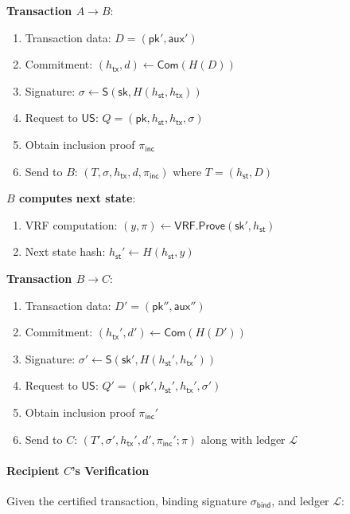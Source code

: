 \documentclass{article}
\newcommand{\sig}[0]{\mathsf{S}}
\newcommand{\pubkey}[0]{\mathsf{pk}}
\newcommand{\prikey}[0]{\mathsf{sk}}
\newcommand{\commit}[0]{\mathsf{Com}}
\newcommand{\unisrv}[0]{\mathsf{US}}
\newcommand{\sthash}[0]{{h_\mathsf{st}}}
\newcommand{\txhash}[0]{{h_\mathsf{tx}}}
\newcommand{\auxd}[0]{\mathsf{aux}}
\newcommand{\pinc}[0]{{\pi_{\mathsf{inc}}}}
\begin{document}
\medskip
\noindent\textbf{Transaction $A \to B$}:

\begin{enumerate}
\item Transaction data: $D = (\pubkey', \auxd')$
\item Commitment: $(\txhash, d) \gets \commit(H(D))$
\item Signature: $\sigma \gets \sig(\prikey, H(\sthash, \txhash))$
\item Request to $\unisrv$: $Q = (\pubkey, \sthash, \txhash, \sigma)$
\item Obtain inclusion proof $\pinc$
\item Send to $B$: $(T, \sigma, \txhash, d, \pinc)$ where $T = (\sthash, D)$
\end{enumerate}

\medskip
\noindent\textbf{$B$ computes next state}:

\begin{enumerate}
\item VRF computation: $(y, \pi) \gets \mathsf{VRF.Prove}(\prikey', \sthash)$
\item Next state hash: $\sthash' \gets H(\sthash, y)$
\end{enumerate}

\medskip
\noindent\textbf{Transaction $B \to C$}:

\begin{enumerate}
\item Transaction data: $D' = (\pubkey'', \auxd'')$
\item Commitment: $(\txhash', d') \gets \commit(H(D'))$
\item Signature: $\sigma' \gets \sig(\prikey', H(\sthash', \txhash'))$
\item Request to $\unisrv$: $Q' = (\pubkey', \sthash', \txhash', \sigma')$
\item Obtain inclusion proof $\pinc'$
\item Send to $C$: $(T', \sigma', \txhash', d', \pinc'; \pi)$ along with ledger $\mathcal{L}$
\end{enumerate}

\paragraph{Recipient $C$'s Verification}

Given the certified transaction, binding signature $\sigma_{\mathsf{bind}}$, and ledger $\mathcal{L}$:
\end{document}
